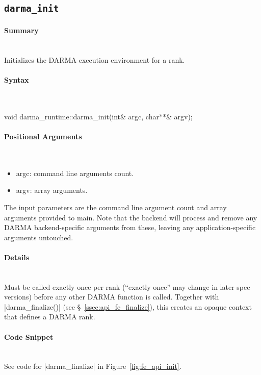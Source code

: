
\subsection{\texttt{darma\_init}}

\paragraph{Summary}\mbox{}\\
Initializes the DARMA execution environment for a rank.

\paragraph{Syntax}\mbox{}\\
\begin{CppCode}
void darma_runtime::darma_init(int& argc, char**& argv);
\end{CppCode}

\paragraph{Positional Arguments}\mbox{}\\
\begin{itemize}
\item argc: command line arguments count.
\item argv: array arguments.
\end{itemize}
The input parameters are the command line argument count 
and array arguments provided to main.  
Note that the backend will process and remove 
any DARMA backend-specific arguments from these, leaving any
application-specific arguments untouched.


\paragraph{Details}\mbox{}\\
Must be called exactly once per rank (``exactly once'' may change in later
spec versions) before any other DARMA function is called.
Together with |darma\_finalize()| (see \S~\ref{ssec:api_fe_finalize}),
this creates an opaque context that defines a DARMA rank.

\paragraph{Code Snippet}\mbox{}\\ 
See code for |darma\_finalize| in Figure~\ref{fig:fe_api_init}.

